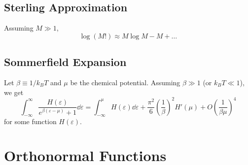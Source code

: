 \documentclass[oneside]{book}
\numberwithin{figure}{section}
\numberwithin{equation}{section}
\newcommand{\paren}[1]{\left(#1\right)}
\newcommand{\veps}{\varepsilon}
\theoremstyle{definition}
\begin{document}
	\section{Sterling Approximation}
	Assuming $ M \gg 1 $,
	\begin{equation}
		\log(M!) \approx M\log M - M + \ldots
	\end{equation}

	\section{Sommerfield Expansion}
	Let $ \beta \equiv 1/k_BT $ and $ \mu $ be the chemical potential. Assuming $ \beta \gg 1 $ (or $ k_BT \ll 1 $), we get
	\begin{equation}
		\int_{-\infty}^{\infty}\dfrac{H(\veps)}{e^{\beta(\veps - \mu)} + 1}\dd{\veps} = \int_{-\infty}^{\mu}H(\veps)\dd{\veps} + \dfrac{\pi^2}{6}\paren{\dfrac{1}{\beta}}^2H'(\mu) + O\paren{\dfrac{1}{\beta\mu}}^4
	\end{equation}
	for some function $ H(\veps) $.

	\chapter{Orthonormal Functions}
\end{document}
